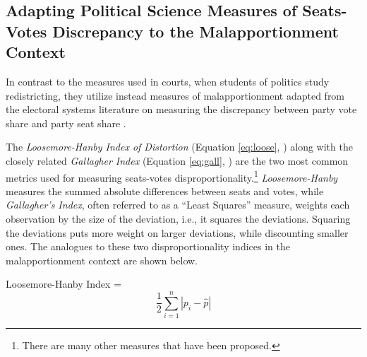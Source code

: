 

\subsection*{Adapting Political Science Measures of Seats-Votes Discrepancy to the Malapportionment Context} \label{sec:comparative}
%
In contrast to the measures used in courts, when students of politics study redistricting, they utilize instead measures of malapportionment adapted from the electoral systems literature on measuring the discrepancy between party vote share and party seat share \citep[][pg. 654]{SamuelsSnyder2001, SaugerGrofman2016}. 


The \textit{Loosemore-Hanby Index of Distortion} (Equation \ref{eq:loose}, \citealt{Loosemore1971}) along with the closely related \textit{Gallagher Index} (Equation \ref{eq:gall}, \citealt{Gallagher1991}) are the two most common metrics used for measuring seats-votes disproportionality.\footnote{There are many other measures that have been proposed.} \textit{Loosemore-Hanby} measures the summed absolute differences between seats and votes, while \textit{Gallagher’s Index}, often referred to as a ``Least Squares'' measure, weights each observation by the size of the deviation, i.e., it squares the deviations. Squaring the deviations puts more weight on larger deviations, while discounting smaller ones. The analogues to these two disproportionality indices in the malapportionment context are shown below. 

%
  Loosemore-Hanby Index =
  \begin{equation}\label{eq:loose}
  \frac{1}{2}\sum_{i=1}^{n}{|p_i - \hat{p}|}
  \end{equation}

